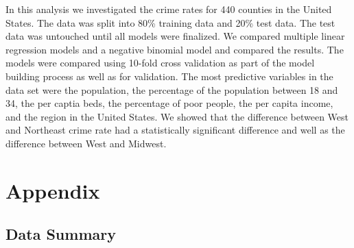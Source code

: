 \documentclass[]{article}
\begin{document}
In this analysis we investigated the crime rates for 440 counties in the
United States. The data was split into 80\% training data and 20\%
test data. The test data was untouched until all models were
finalized. We compared multiple linear regression models and a negative
binomial model and compared the results. The models were compared using
10-fold cross validation as part of the model building process as well
as for validation. The most predictive variables in the data set were
the population, the percentage of the population between 18 and 34, the
per captia beds, the percentage of poor people, the per capita income,
and the region in the United States. We showed that the difference
between West and Northeast crime rate had a statistically significant
difference and well as the difference between West and Midwest.

\pagebreak

\section{Appendix}\label{appendix}

\subsection{Data Summary}\label{data-summary}
\end{document}
